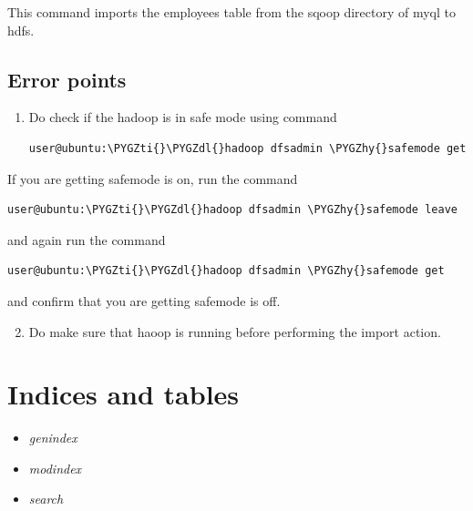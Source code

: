 \documentclass[letterpaper,10pt,english]{sphinxmanual}
\def\PYGZdl{\char`\$}
\def\PYGZhy{\char`\-}
\def\PYGZti{\char`\~}
\begin{document}
This command imports the employees table from the sqoop directory of myql to hdfs.


\section{Error points}
\label{importdata:error-points}\begin{enumerate}
\item {} 
Do check if the hadoop is in safe mode using command

\begin{Verbatim}[commandchars=\\\{\}]
user@ubuntu:\PYGZti{}\PYGZdl{}hadoop dfsadmin \PYGZhy{}safemode get
\end{Verbatim}

\end{enumerate}

If you are getting safemode is on, run the command

\begin{Verbatim}[commandchars=\\\{\}]
user@ubuntu:\PYGZti{}\PYGZdl{}hadoop dfsadmin \PYGZhy{}safemode leave
\end{Verbatim}

and again run the command

\begin{Verbatim}[commandchars=\\\{\}]
user@ubuntu:\PYGZti{}\PYGZdl{}hadoop dfsadmin \PYGZhy{}safemode get
\end{Verbatim}

and confirm that you are getting safemode is off.
\begin{enumerate}
\setcounter{enumi}{1}
\item {} 
Do make sure that haoop is running before performing the import action.

\end{enumerate}


\chapter{Indices and tables}
\label{index:indices-and-tables}\begin{itemize}
\item {} 
\emph{genindex}

\item {} 
\emph{modindex}

\item {} 
\emph{search}

\end{itemize}



\renewcommand{\indexname}{Index}
\printindex
\end{document}
